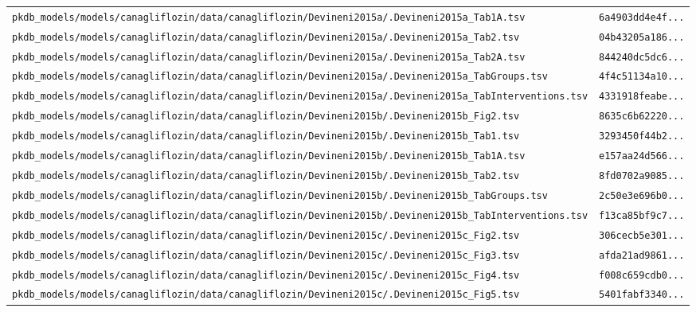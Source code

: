 \begin{longtable}{ll}
\texttt{pkdb\_models/models/canagliflozin/data/canagliflozin/Devineni2015a/.Devineni2015a\_Tab1A.tsv} & \texttt{6a4903dd4e4f...} \\
\texttt{pkdb\_models/models/canagliflozin/data/canagliflozin/Devineni2015a/.Devineni2015a\_Tab2.tsv} & \texttt{04b43205a186...} \\
\texttt{pkdb\_models/models/canagliflozin/data/canagliflozin/Devineni2015a/.Devineni2015a\_Tab2A.tsv} & \texttt{844240dc5dc6...} \\
\texttt{pkdb\_models/models/canagliflozin/data/canagliflozin/Devineni2015a/.Devineni2015a\_TabGroups.tsv} & \texttt{4f4c51134a10...} \\
\texttt{pkdb\_models/models/canagliflozin/data/canagliflozin/Devineni2015a/.Devineni2015a\_TabInterventions.tsv} & \texttt{4331918feabe...} \\
\texttt{pkdb\_models/models/canagliflozin/data/canagliflozin/Devineni2015b/.Devineni2015b\_Fig2.tsv} & \texttt{8635c6b62220...} \\
\texttt{pkdb\_models/models/canagliflozin/data/canagliflozin/Devineni2015b/.Devineni2015b\_Tab1.tsv} & \texttt{3293450f44b2...} \\
\texttt{pkdb\_models/models/canagliflozin/data/canagliflozin/Devineni2015b/.Devineni2015b\_Tab1A.tsv} & \texttt{e157aa24d566...} \\
\texttt{pkdb\_models/models/canagliflozin/data/canagliflozin/Devineni2015b/.Devineni2015b\_Tab2.tsv} & \texttt{8fd0702a9085...} \\
\texttt{pkdb\_models/models/canagliflozin/data/canagliflozin/Devineni2015b/.Devineni2015b\_TabGroups.tsv} & \texttt{2c50e3e696b0...} \\
\texttt{pkdb\_models/models/canagliflozin/data/canagliflozin/Devineni2015b/.Devineni2015b\_TabInterventions.tsv} & \texttt{f13ca85bf9c7...} \\
\texttt{pkdb\_models/models/canagliflozin/data/canagliflozin/Devineni2015c/.Devineni2015c\_Fig2.tsv} & \texttt{306cecb5e301...} \\
\texttt{pkdb\_models/models/canagliflozin/data/canagliflozin/Devineni2015c/.Devineni2015c\_Fig3.tsv} & \texttt{afda21ad9861...} \\
\texttt{pkdb\_models/models/canagliflozin/data/canagliflozin/Devineni2015c/.Devineni2015c\_Fig4.tsv} & \texttt{f008c659cdb0...} \\
\texttt{pkdb\_models/models/canagliflozin/data/canagliflozin/Devineni2015c/.Devineni2015c\_Fig5.tsv} & \texttt{5401fabf3340...} \\

\end{longtable}
